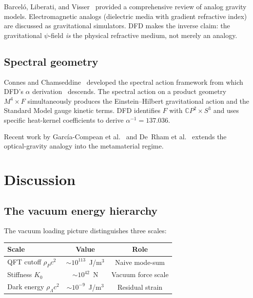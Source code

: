 \documentclass[aps,prd,twocolumn,superscriptaddress,nofootinbib]{revtex4-2}
\newcommand{\CP}{\mathbb{C}P}
\begin{document}
Barcel\'{o}, Liberati, and Visser~\cite{Barcelo2011} provided a
comprehensive review of analog gravity models.  Electromagnetic
analogs (dielectric media with gradient refractive index) are
discussed as gravitational simulators.  DFD makes the inverse claim:
the gravitational $\psi$-field \emph{is} the physical refractive
medium, not merely an analogy.

\subsection{Spectral geometry}

Connes and Chamseddine~\cite{Connes1997,Chamseddine2008} developed the
spectral action framework from which DFD's $\alpha$
derivation~\cite{Alcock2025AbInitio} descends.  The spectral action on
a product geometry $M^4 \times F$ simultaneously produces the
Einstein--Hilbert gravitational action and the Standard Model gauge
kinetic terms.  DFD identifies $F$ with $\CP^2 \times S^3$ and uses
specific heat-kernel coefficients to derive $\alpha^{-1} = 137.036$.

Recent work by Garc\'{i}a-Compean et al.~\cite{Garcia2024} and
De~Rham et al.~\cite{DeRham2025} extends the optical-gravity analogy
into the metamaterial regime.


\section{Discussion}
\label{sec:discussion}

\subsection{The vacuum energy hierarchy}

The vacuum loading picture distinguishes three scales:
\begin{center}
\begin{tabular}{lcc}
\toprule
\textbf{Scale} & \textbf{Value} & \textbf{Role} \\
\midrule
QFT cutoff $\rho_P c^2$ & $\sim 10^{113}$~J/m$^3$ & Naive mode-sum \\
Stiffness $K_0$ & $\sim 10^{42}$~N & Vacuum force scale \\
Dark energy $\rho_\Lambda c^2$ & $\sim 10^{-9}$~J/m$^3$ & Residual strain \\
\bottomrule
\end{tabular}
\end{center}
\end{document}

